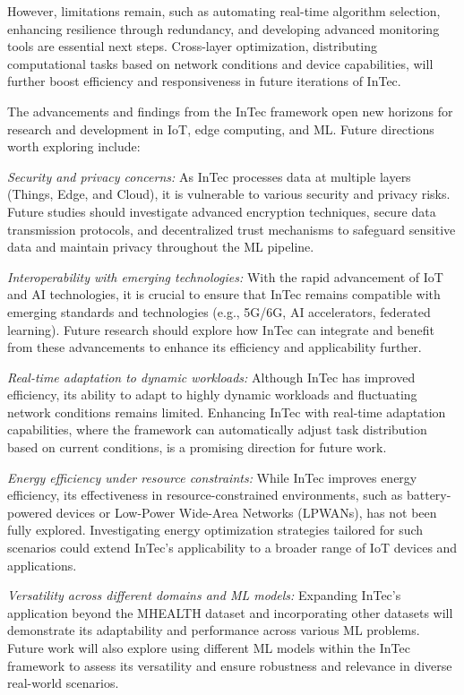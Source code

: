 \documentclass[11pt]{article}
\begin{document}
	However, limitations remain, such as automating real-time algorithm selection,
	enhancing resilience through redundancy, and developing advanced monitoring tools are essential next steps. Cross-layer optimization, distributing computational
	tasks based on network conditions and device capabilities, will further boost efficiency and responsiveness in future iterations of InTec.
	
	The advancements and findings from the InTec framework open new horizons for
	research and development in IoT, edge computing, and ML. Future directions worth
	exploring include:
	
	\textit{Security and privacy concerns:} As InTec processes data at multiple layers
	(Things, Edge, and Cloud), it is vulnerable to various security and privacy risks.
	Future studies should investigate advanced encryption techniques, secure data transmission protocols, and decentralized trust mechanisms to safeguard sensitive data
	and maintain privacy throughout the ML pipeline.
	
	\textit{Interoperability with emerging technologies:} With the rapid advancement
	of IoT and AI technologies, it is crucial to ensure that InTec remains compatible
	with emerging standards and technologies (e.g., 5G/6G, AI accelerators, federated learning). Future research should explore how InTec can integrate and benefit from
	these advancements to enhance its efficiency and applicability further.
	
	\textit{Real-time adaptation to dynamic workloads:} Although InTec has improved efficiency, its ability to adapt to highly dynamic workloads and fluctuating network
	conditions remains limited. Enhancing InTec with real-time adaptation capabilities,
	where the framework can automatically adjust task distribution based on current
	conditions, is a promising direction for future work.
	
	\textit{Energy efficiency under resource constraints:} While InTec improves energy
	efficiency, its effectiveness in resource-constrained environments, such as battery-powered devices or Low-Power Wide-Area Networks (LPWANs), has not been fully
	explored. Investigating energy optimization strategies tailored for such scenarios
	could extend InTec’s applicability to a broader range of IoT devices and applications.
	
	\textit{Versatility across different domains and ML models:} Expanding InTec’s application beyond the MHEALTH dataset and incorporating other datasets will demonstrate its adaptability and performance across various ML problems. Future work
	will also explore using different ML models within the InTec framework to assess its
	versatility and ensure robustness and relevance in diverse real-world scenarios.
	
	
	
	
	
\end{document}
